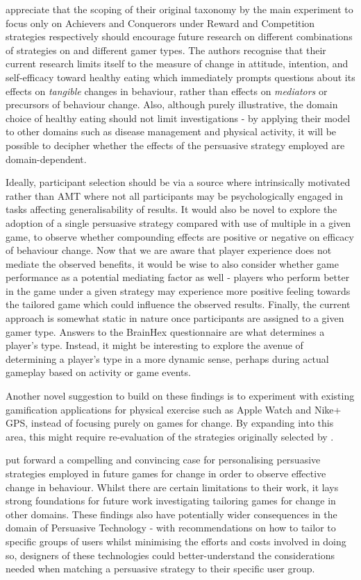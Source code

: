 \documentclass[11pt]{article}
\begin{document}
\citeauthor{orji2017} appreciate that the scoping of their original taxonomy by the main experiment to focus only on Achievers and Conquerors under Reward and Competition strategies respectively should encourage future research on different combinations of strategies on and different gamer types. The authors recognise that their current research limits itself to the measure of change in attitude, intention, and self-efficacy toward healthy eating which immediately prompts questions about its effects on \textit{tangible} changes in behaviour, rather than effects on \textit{mediators} or precursors of behaviour change. Also, although purely illustrative, the domain choice of healthy eating should not limit investigations - by applying their model to other domains such as disease management and physical activity, it will be possible to decipher whether the effects of the persuasive strategy employed are domain-dependent.  

Ideally, participant selection should be via a source where intrinsically motivated rather than AMT where not all participants may be psychologically engaged in tasks affecting generalisability of results. It would also be novel to explore the adoption of a single persuasive strategy compared with use of multiple in a given game, to observe whether compounding effects are positive or negative on efficacy of behaviour change. Now that we are aware that player experience does not mediate the observed benefits, it would be wise to also consider whether game performance as a potential mediating factor as well - players who perform better in the game under a given strategy may experience more positive feeling towards the tailored game which could influence the observed results. Finally, the current approach is somewhat static in nature once participants are assigned to a given gamer type. Answers to the BrainHex questionnaire are what determines a player's type. Instead, it might be interesting to explore the avenue of determining a player's type in a more dynamic sense, perhaps during actual gameplay based on activity or game events.

Another novel suggestion to build on these findings is to experiment with existing gamification applications for physical exercise such as Apple Watch and Nike+ GPS, instead of focusing purely on games for change. By expanding into this area, this might require re-evaluation of the strategies originally selected by \citet{gerling2014}.

\citet{orji2017} put forward a compelling and convincing case for personalising persuasive strategies employed in future games for change in order to observe effective change in behaviour. Whilst there are certain limitations to their work, it lays strong foundations for future work investigating tailoring games for change in other domains. These findings also have potentially wider consequences in the domain of Persuasive Technology - with recommendations on how to tailor to specific groups of users whilst minimising the efforts and costs involved in doing so, designers of these technologies could better-understand the considerations needed when matching a persuasive strategy to their specific user group.


\newpage
\small

\normalsize
\end{document}
